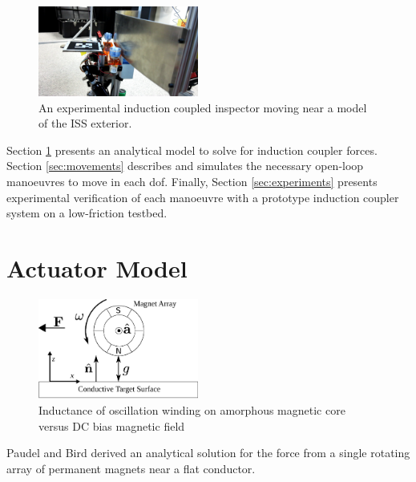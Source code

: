 \documentclass[letterpaper, 10 pt, conference]{ieeeconf}  %
\begin{document}
%
 \begin{figure}[thpb]
      \centering

      \includegraphics[width = 0.47\textwidth]{figures/screenshot.png}
      \caption{An experimental induction coupled inspector moving near a model of the ISS exterior.}
      \label{fig:realpicture}
   \end{figure}
Section \ref{sec:model} presents an analytical model to solve for induction coupler forces. Section \ref{sec:movements} describes and simulates the necessary open-loop manoeuvres to move in each dof. Finally, Section \ref{sec:experiments} presents experimental verification of each manoeuvre with a prototype induction coupler system on a low-friction testbed.
%

  
\section{Actuator Model}
\label{sec:model}
 \begin{figure}[thpb]
      \centering

      \includegraphics[width = 0.47\textwidth]{figures/spin_mag_diagram.eps}
      \caption{Inductance of oscillation winding on amorphous
       magnetic core versus DC bias magnetic field}
      \label{A single induction coupler}
   \end{figure}
   

Paudel and Bird derived an analytical solution for the force from a single rotating array of permanent magnets near a flat conductor. \cite{Paudel2013}
\end{document}
